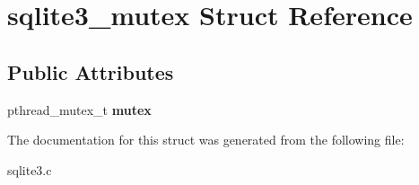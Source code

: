 \hypertarget{structsqlite3__mutex}{}\section{sqlite3\+\_\+mutex Struct Reference}
\label{structsqlite3__mutex}
\subsection*{Public Attributes}
\begin{DoxyCompactItemize}
\item 
pthread\+\_\+mutex\+\_\+t {\bfseries mutex}\hypertarget{structsqlite3__mutex_a6eef25bee73a3640dbbd052d707dbfdc}{}\label{structsqlite3__mutex_a6eef25bee73a3640dbbd052d707dbfdc}

\end{DoxyCompactItemize}


The documentation for this struct was generated from the following file\+:\begin{DoxyCompactItemize}
\item 
sqlite3.\+c\end{DoxyCompactItemize}

